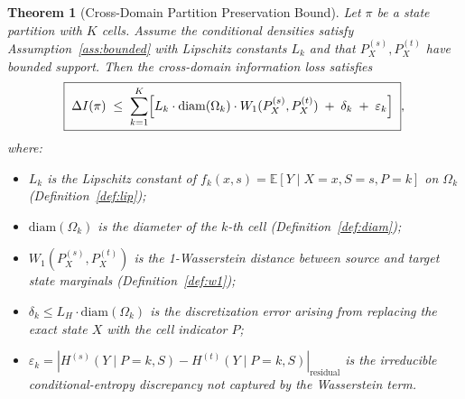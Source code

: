 \documentclass[12pt,a4paper]{article}
\newtheorem{theorem}{Theorem}[section]
\newcommand{\E}{\mathbb{E}}
\newcommand{\Wass}{W_1}
\newcommand{\diam}{\mathrm{diam}}
\begin{document}
\begin{theorem}[Cross-Domain Partition Preservation Bound]
\label{thm:main-bound}
Let $\pi$ be a state partition with $K$ cells.  Assume the conditional
densities satisfy Assumption~\ref{ass:bounded} with Lipschitz constants
$L_k$ and that $P_X^{(s)},P_X^{(t)}$ have bounded support.
Then the cross-domain information loss satisfies
\begin{equation}\label{eq:main-ineq}
    \boxed{\;
    \Delta I(\pi) \;\leq\;
    \sum_{k=1}^{K}
    \Bigl[
        L_k \cdot \diam(\Omega_k) \cdot \Wass(P^{(s)}_X, P^{(t)}_X)
        \;+\; \delta_k
        \;+\; \varepsilon_k
    \Bigr]
    \;},
\end{equation}
where:
\begin{itemize}[nosep]
    \item $L_k$ is the Lipschitz constant of $f_k(x,s)=\E[Y\mid X=x,S=s,
          P=k]$ on $\Omega_k$ (Definition~\ref{def:lip});
    \item $\diam(\Omega_k)$ is the diameter of the $k$-th cell
          (Definition~\ref{def:diam});
    \item $\Wass(P^{(s)}_X,P^{(t)}_X)$ is the 1-Wasserstein distance
          between source and target state marginals
          (Definition~\ref{def:w1});
    \item $\delta_k \leq L_H\cdot\diam(\Omega_k)$ is the discretization
          error arising from replacing the exact state $X$ with the cell
          indicator $P$;
    \item $\varepsilon_k = |H^{(s)}(Y\mid P=k,S) -
          H^{(t)}(Y\mid P=k,S)|_{\text{residual}}$ is the irreducible
          conditional-entropy discrepancy not captured by the
          Wasserstein term.
\end{itemize}
\end{theorem}
\end{document}
